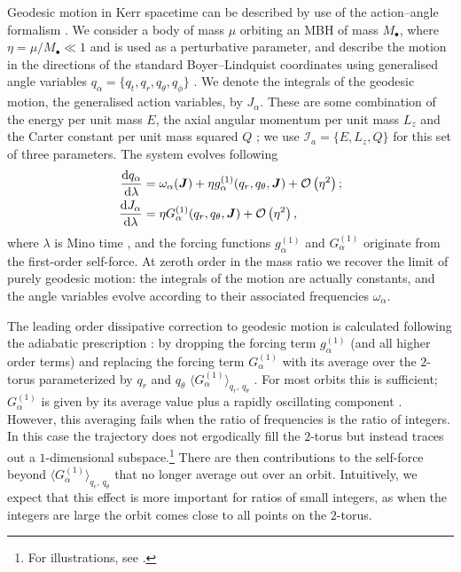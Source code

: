Geodesic motion in Kerr spacetime can be described by use of the action--angle formalism \citep[chapter 10]{Goldstein2002}. We consider a body of mass $\mu$ orbiting an MBH of mass $M_\bullet$, where $\eta = \mu/M_\bullet \ll 1$ and is used as a perturbative parameter, and describe the motion in the directions of the standard Boyer--Lindquist coordinates using generalised angle variables $q_\alpha = \{q_t,q_r,q_\theta,q_\phi\}$ \citep{Hinderer2008}. We denote the integrals of the geodesic motion, the generalised action variables, by $J_\alpha$. These are some combination of the energy per unit mass $E$, the axial angular momentum per unit mass $L_z$ and the Carter constant per unit mass squared $Q$ \citep{Carter1968}; we use $\mathcal{I}_a = \{E,L_z,Q\}$ for this set of three parameters. The system evolves following \citep{Flanagan2012}
\begin{subequations}\label{eq:Mino-E-o-M}
\begin{align}
\dfrac{\mathrm{d} {q_\alpha}}{\mathrm{d} {\lambda}} = {} & \omega_\alpha(\boldsymbol{J}) + \eta g_\alpha^{(1)}(q_r,q_\theta,\boldsymbol{J}) + \mathcal{O}\left({\eta^2}\right); \\
\dfrac{\mathrm{d} {J_\alpha}}{\mathrm{d} {\lambda}} = {} & \eta G_\alpha^{(1)}(q_r,q_\theta,\boldsymbol{J}) + \mathcal{O}\left({\eta^2}\right),
\end{align}
\end{subequations}
where $\lambda$ is Mino time \citep{Mino2003}, and the forcing functions $g_\alpha^{(1)}$ and $G_\alpha^{(1)}$ originate from the first-order self-force. At zeroth order in the mass ratio we recover the limit of purely geodesic motion: the integrals of the motion are actually constants, and the angle variables evolve according to their associated frequencies $\omega_\alpha$.

The leading order dissipative correction to geodesic motion is calculated following the adiabatic prescription \citep{Hinderer2008}: by dropping the forcing term $g_\alpha^{(1)}$ (and all higher order terms) and replacing the forcing term $G_\alpha^{(1)}$ with its average over the $2$-torus parameterized by $q_r$ and $q_\theta$ $\langle G_\alpha^{(1)}\rangle_{q_r,\,q_\theta}$ \citep{Drasco2005}. For most orbits this is sufficient; $G_\alpha^{(1)}$ is given by its average value plus a rapidly oscillating component \citep[chapter 5, section 1]{Arnold1988}. However, this averaging fails when the ratio of frequencies is the ratio of integers. In this case the trajectory does not ergodically fill the $2$-torus but instead traces out a $1$-dimensional subspace.\footnote{For illustrations, see \citet{Grossman2012}.} There are then contributions to the self-force beyond $\langle G_\alpha^{(1)}\rangle_{q_r,\,q_\theta}$ that no longer average out over an orbit. Intuitively, we expect that this effect is more important for ratios of small integers, as when the integers are large the orbit comes close to all points on the $2$-torus.

